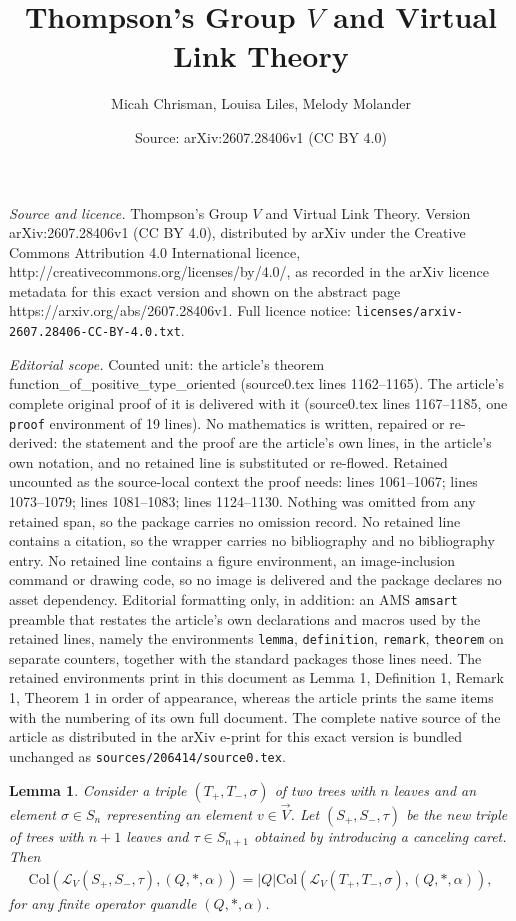 \documentclass[10pt,a4paper]{amsart}
\title{Thompson's Group $V$ and Virtual Link Theory}
\author{Micah Chrisman, Louisa Liles, Melody Molander}
\date{Source: arXiv:2607.28406v1 (CC BY 4.0)}
\newtheorem{lemma}{Lemma}
\begin{document}
\maketitle

\noindent\emph{Source and licence.} Thompson's Group $V$ and Virtual Link Theory. Version arXiv:2607.28406v1 (CC BY 4.0), distributed by arXiv under the Creative Commons Attribution 4.0 International licence, http://creativecommons.org/licenses/by/4.0/, as recorded in the arXiv licence metadata for this exact version and shown on the abstract page https://arxiv.org/abs/2607.28406v1. Full licence notice: \texttt{licenses/arxiv-2607.28406-CC-BY-4.0.txt}.\par\smallskip

\noindent\textit{Editorial scope.} Counted unit: the article's theorem function\_of\_positive\_type\_oriented (source0.tex lines 1162--1165). The article's complete original proof of it is delivered with it (source0.tex lines 1167--1185, one \texttt{proof} environment of 19 lines). No mathematics is written, repaired or re-derived: the statement and the proof are the article's own lines, in the article's own notation, and no retained line is substituted or re-flowed.  Retained uncounted as the source-local context the proof needs: lines 1061--1067; lines 1073--1079; lines 1081--1083; lines 1124--1130.  Nothing was omitted from any retained span, so the package carries no omission record.  No retained line contains a citation, so the wrapper carries no bibliography and no bibliography entry.  No retained line contains a figure environment, an image-inclusion command or drawing code, so no image is delivered and the package declares no asset dependency.  Editorial formatting only, in addition: an AMS \texttt{amsart} preamble that restates the article's own declarations and macros used by the retained lines, namely the environments \texttt{lemma}, \texttt{definition}, \texttt{remark}, \texttt{theorem} on separate counters, together with the standard packages those lines need.  The retained environments print in this document as Lemma 1, Definition 1, Remark 1, Theorem 1 in order of appearance, whereas the article prints the same items with the numbering of its own full document.  The complete native source of the article as distributed in the arXiv e-print for this exact version is bundled unchanged as \texttt{sources/206414/source0.tex}.
\begin{lemma}\label{lem: numberofopqcoloringswithcarets}
    Consider a triple $(T_+, T_-, \sigma)$ of two trees with $n$ leaves and an element $\sigma \in S_n$ representing an element $v \in \vec{V}$. Let $(S_+, S_-, \tau)$ be the new triple of trees with $n+1$ leaves and $\tau \in S_{n+1}$ obtained by introducing a canceling caret. Then
    \begin{align*}
        \text{Col}(\mathscr{L}_{V}(S_+,S_-,\tau), (Q, *,\alpha))=|Q|\text{Col}(\mathscr{L}_{V}(T_+,T_-,\sigma), (Q,*,\alpha)),
    \end{align*}
    for any finite operator quandle $(Q,*,\alpha)$.
\end{lemma}
\end{document}
